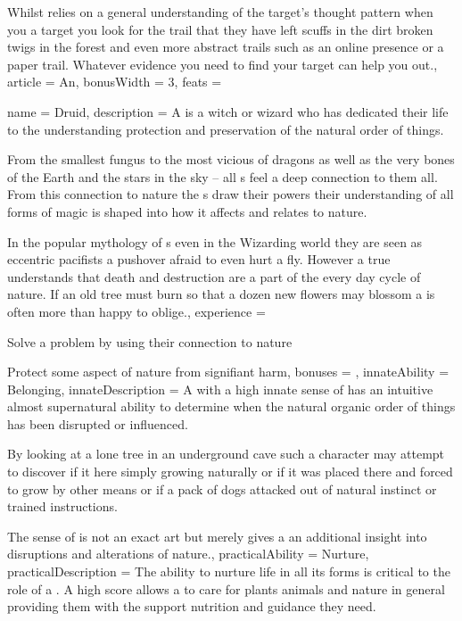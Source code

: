 {Whilst  relies on a general understanding of the target's thought pattern\comma{} when you  a target you look for the trail that they have left \minus{} scuffs in the dirt\comma{} broken twigs in the forest and even more abstract trails such as an online presence or a paper trail. Whatever evidence you need to find your target\comma{}  can help you out.,
	article = An,
	bonusWidth = 3, feats = \AurorFeats
}

\archetype
{
	name = Druid,
	description = A {\bname{}} is a witch or wizard who has dedicated their life to the understanding\comma{} protection and preservation of the natural order of things. 

From the smallest fungus\comma{} to the most vicious of dragons\comma{} as well as the very bones of the Earth\comma{} and the stars in the sky – all {\bname{}}s feel a deep connection to them all. From this connection to nature\comma{} the \bname{}s draw their powers their understanding of all forms of magic is shaped into how it affects and relates to nature.

In the popular mythology of \bname{}s\comma{} even in the Wizarding world\comma{} they are seen as eccentric pacifists\comma{} a pushover afraid to even hurt a fly. However\comma{} a true \bname{} understands that death and destruction are a part of the every day cycle of nature. If an old tree must burn so that a dozen new flowers may blossom\comma{} a  is often more than happy to oblige.,
	experience = \item Solve a problem by using their connection to nature
\item Protect some aspect of nature from signifiant harm,
	bonuses = 
,
	innateAbility = Belonging,
	innateDescription = A \bname{} with a high innate sense of  has an intuitive\comma{} almost supernatural ability to determine when the natural\comma{} organic\comma{} order of things has been disrupted or influenced.

By looking at a lone tree in an underground cave\comma{} such a character may attempt to discover if it  here\comma{} simply growing naturally\comma{} or if it was placed there and forced to grow by other means\comma{} or if a pack of dogs attacked out of natural instinct\comma{} or trained instructions. 

The sense of  is not an exact art\comma{} but merely gives a \bname{} an additional insight into disruptions and alterations of nature.,
	practicalAbility = Nurture,
	practicalDescription = The ability to nurture life\comma{} in all its forms\comma{} is critical to the role of a \bname{}. A high  score allows a \bname{} to care for plants\comma{} animals and nature in general\comma{} providing them with the support\comma{} nutrition and guidance they need.

}
